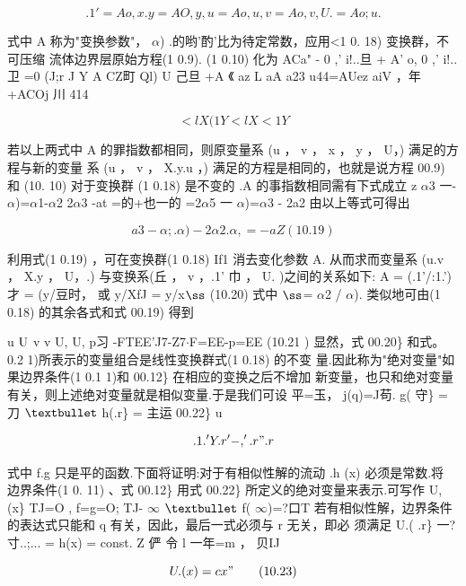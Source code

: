 \begin{equation*}.1' = Ao, x. y = AO, y , u = Ao, u , v = Ao, v , U. = Ao;u.\tag{10.18}\end{equation*}

式中 A 称为"变换参数"， $\alpha$) .的哟'酌'比为待定常数，应用<1 0. 18) 变换群，不可压缩 流体边界层原始方程(1 0.9). (1 0.10) 化为 ACa" - 0 ,' i!..旦 + A' o, 0 ,' i!..卫 =0 (J;r J Y A CZ町 Ql) U 己旦 +A 《 az L aA a23 u44=AUez aiV ，年 +ACOj 川 414

\[<lX (1 Y <l X <1 Y\]

若以上两式中 A 的罪指数都相同，则原变量系 (u ， v ， x ， y ， U，) 满足的方程与新的变量 系 (u ， v ， X.y.u ，) 满足的方程是相同的，也就是说方程 00.9) 和 (10. 10) 对于变换群 (1 0.18) 是不变的 .A 的事指数相同需有下式成立 z $\alpha$3 一-$\alpha$)=$\alpha$1-$\alpha$2 2$\alpha$3 -at =的+也一的 =2$\alpha$5 一 $\alpha$)=$\alpha$3 - 2a2 由以上等式可得出

\[a3 - \alpha  ;. \alpha )-2\alpha 2 .\alpha  ,  = - aZ (10. 1 9 )\]

利用式(1 0.19) ，可在变换群(1 0.18) If1 消去变化参数 A. 从而求而变量系 (u.v ， X.y ， U，.) 与变换系(丘 ， v ，.1' 巾 ， U. )之间的关系如下: A = (.1'/:1.') 才 = (y/豆时， 或 y/XfJ = y/x${\rm ß}$ (10.20) 式中 ${\rm ß}$= $\alpha$2 / $\alpha$). 类似地可由(1 0.18) 的其余各式和式 00.19) 得到

u ${\rm U}$ v v U, U, p习 -FTEE'J7-Z7$\cdot $F=EE-p=EE (10.21 ) 显然，式 00.20\} 和式。 0.2 1)所表示的变量组合是线性变换群式(1 0.18) 的不变 量.因此称为"绝对变量"如果边界条件(1 0.1 1)和 00.12\} 在相应的变换之后不增加 新变量，也只和绝对变量有关，则上述绝对变量就是相似变量.于是我们可设 平=玉， j(q)=J苟. g( 守\} =刀 ${\rm •}$ h(.r\} = 主运 00.22\} u

\[.1.'Y .r' -,' .r " .r\]

式中 f.g 只是平的函数.下面将证明:对于有相似性解的流动 .h (x) 必须是常数.将 边界条件(1 0. 11) 、式 00.12\} 用式 00.22\} 所定义的绝对变量来表示.可写作 U, (x\} TJ=O , f=g=O; TJ- $\infty$ ${\rm •}$ f( $\infty$)=?口T 若有相似性解，边界条件的表达式只能和 q 有关，因此，最后一式必须与 r 无关，即必 须满足 U.( .r\} 一?寸..;... = h(x) = const. Z 俨 令 l 一年=m ， 贝IJ

\begin{equation*}U.(x) = cx"\tag{10.23}\end{equation*}

